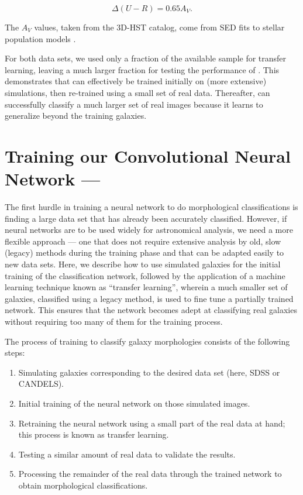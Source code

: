 \begin{equation}
    \Delta (U-R) = 0.65 A_V  .
\end{equation}

\noindent
The $A_V$ values, taken from the 3D-HST catalog, come from SED fits to stellar population models \citep{3dhst}. 

For both data sets, we used only a fraction of the available sample for transfer learning, leaving a much larger fraction for testing the performance of \gamornet{}. This demonstrates that \gamornet{} can effectively be trained initially on (more extensive) simulations, then re-trained using a small set of real data. Thereafter, \gamornet{} can successfully classify a much larger set of real images because it learns to generalize beyond the training galaxies.


\section{Training our Convolutional Neural Network --- \gamornet{}} \label{sec:methods}

The first hurdle in training a neural network to do morphological classifications is finding a large data set that has already been accurately classified. However, if neural networks are to be used widely for astronomical analysis, we need a more flexible approach --- one that does not require extensive analysis by old, slow (legacy) methods during the training phase and that can be adapted easily to new data sets. Here, we describe how to use simulated galaxies for the initial training of the classification network, followed by the application of a machine learning technique known as ``transfer learning'', wherein a much smaller set of galaxies, classified using a legacy method, is used to fine tune a partially trained network. This ensures that the network becomes adept at classifying real galaxies without requiring too many of them for the training process.

The process of training \gamornet{} to classify galaxy morphologies consists of the following steps:
\begin{enumerate}[noitemsep]
\item Simulating galaxies corresponding to the desired data set (here, SDSS or CANDELS).
\item Initial training of the neural network on those simulated images.
\item Retraining the neural network using a small part of the real data at hand; this process is known as transfer learning.
\item Testing a similar amount of real data to validate the results.
\item Processing the remainder of the real data through the trained network to obtain morphological classifications. 
\end{enumerate}
 
